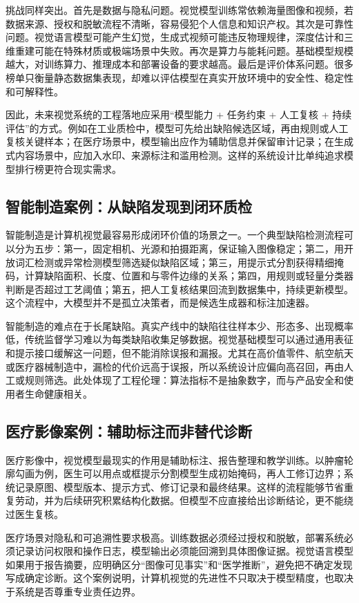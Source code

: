 \documentclass[UTF8,a4paper,12pt]{ctexart}
\begin{document}
挑战同样突出。首先是数据与隐私问题。视觉模型训练常依赖海量图像和视频，若数据来源、授权和脱敏流程不清晰，容易侵犯个人信息和知识产权。其次是可靠性问题。视觉语言模型可能产生幻觉，生成式视频可能违反物理规律，深度估计和三维重建可能在特殊材质或极端场景中失败。再次是算力与能耗问题。基础模型规模越大，对训练算力、推理成本和部署设备的要求越高。最后是评价体系问题。很多榜单只衡量静态数据集表现，却难以评估模型在真实开放环境中的安全性、稳定性和可解释性。

因此，未来视觉系统的工程落地应采用“模型能力 + 任务约束 + 人工复核 + 持续评估”的方式。例如在工业质检中，模型可先给出缺陷候选区域，再由规则或人工复核关键样本；在医疗场景中，模型输出应作为辅助信息并保留审计记录；在生成式内容场景中，应加入水印、来源标注和滥用检测。这样的系统设计比单纯追求模型排行榜更符合现实需求。

\subsection{智能制造案例：从缺陷发现到闭环质检}
智能制造是计算机视觉最容易形成闭环价值的场景之一。一个典型缺陷检测流程可以分为五步：第一，固定相机、光源和拍摄距离，保证输入图像稳定；第二，用开放词汇检测或异常检测模型筛选疑似缺陷区域；第三，用提示式分割获得精细掩码，计算缺陷面积、长度、位置和与零件边缘的关系；第四，用规则或轻量分类器判断是否超过工艺阈值；第五，把人工复核结果回流到数据集中，持续更新模型。这个流程中，大模型并不是孤立决策者，而是候选生成器和标注加速器。

智能制造的难点在于长尾缺陷。真实产线中的缺陷往往样本少、形态多、出现概率低，传统监督学习难以为每类缺陷收集足够数据。视觉基础模型可以通过通用表征和提示接口缓解这一问题，但不能消除误报和漏报。尤其在高价值零件、航空航天或医疗器械制造中，漏检的代价远高于误报，所以系统设计应偏向高召回，再由人工或规则筛选。此处体现了工程伦理：算法指标不是抽象数字，而与产品安全和使用者生命健康相关。

\subsection{医疗影像案例：辅助标注而非替代诊断}
医疗影像中，视觉模型最现实的作用是辅助标注、报告整理和教学训练。以肿瘤轮廓勾画为例，医生可以用点或框提示分割模型生成初始掩码，再人工修订边界；系统记录原图、模型版本、提示方式、修订记录和最终结果。这样的流程能够节省重复劳动，并为后续研究积累结构化数据。但模型不应直接给出诊断结论，更不能绕过医生复核。

医疗场景对隐私和可追溯性要求极高。训练数据必须经过授权和脱敏，部署系统必须记录访问权限和操作日志，模型输出必须能回溯到具体图像证据。视觉语言模型如果用于报告摘要，应明确区分“图像可见事实”和“医学推断”，避免把不确定发现写成确定诊断。这个案例说明，计算机视觉的先进性不只取决于模型精度，也取决于系统是否尊重专业责任边界。
\end{document}
